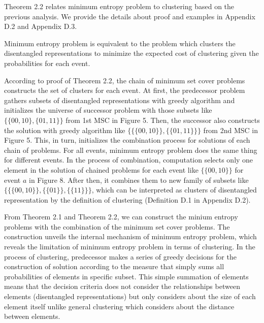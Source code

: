 Theorem 2.2 relates minimum entropy problem to clustering based on the previous analysis.
We provide the details about proof and examples in Appendix D.2 and Appendix D.3.
\begin{theorem}
\label{thm:min_entropy_cluster}
Minimum entropy problem is equivalent to the problem which clusters the disentangled representations 
to minimize the expected cost of clustering given the probabilities for each event.
\end{theorem}
According to proof of Theorem 2.2, 
the chain of minimum set cover problems constructs the set of clusters for each event.
At first, the predecessor problem gathers subsets of disentangled representations with greedy algorithm and 
initializes the universe of successor problem with those subsets like $\{\{00,10\},\{01, 11\}\}$ from 1st MSC in Figure 5.
Then, the successor also constructs the solution with greedy algorithm like $\{\{\{00, 10\}\},\{\{01, 11\}\}\}$ from 2nd MSC in Figure 5.
This, in turn, initializes the combination process for solutions of each chain of problems.
For all events, minimum entropy problem does the same thing for different events.
In the process of combination, computation selects only one element in the solution of chained problems for each event
like $\{\{00, 10\}\}$ for event $a$ in Figure 8.
After then, it combines them to new family of subsets like $\{\{\{00, 10\}\}, \{\{01\}\}, \{\{11\}\}\}$, 
which can be interpreted as clusters of disentangled representation by the definition of clustering (Definition D.1 in Appendix D.2).

From Theorem 2.1 and Theorem 2.2, we can construct the minium entropy problems 
with the combination of the minimum set cover problems.
The construction unveils the internal mechanism of minimum entropy problem, 
which reveals the limitation of minimum entropy problem in terms of clustering.
In the process of clustering, predecessor makes a series of greedy decisions for the construction of solution according to the measure 
that simply sums all probabilities of elements in specific subset.
This simple summation of elements means that the decision criteria does not consider the relationships between elements 
(disentangled representations) but only considers about the size of each element itself 
unlike general clustering which considers about the distance between elements. 

